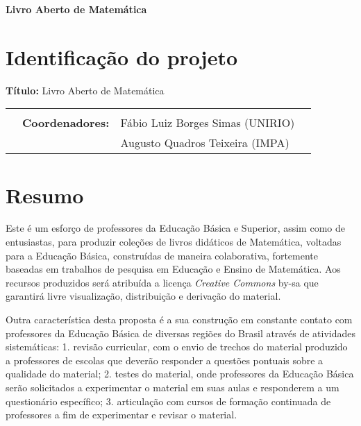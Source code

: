 \documentclass[10 pt]{article}
\begin{document}

\begin{center}
{\Large{\bf   Livro Aberto de Matemática}}
 \end{center}


    \section{Identificação do projeto}
\textbf{T\'itulo:} Livro Aberto de Matemática

\begin{flushright}
  \noindent
  \begin{tabular}{llll}
    &&\\
    &\textbf{Coordenadores:}& Fábio Luiz Borges Simas (UNIRIO)\\
    & & Augusto Quadros Teixeira (IMPA)

  \end{tabular}

\end{flushright}
\vspace{0.3cm}

\section{Resumo}



Este é um esforço de professores da Educação Básica e Superior, assim como de entusiastas, para produzir coleções de livros didáticos de Matemática, voltadas para a Educação Básica, construídas de maneira colaborativa, fortemente baseadas em trabalhos de pesquisa em Educação e Ensino de Matemática.
Aos recursos produzidos será atribuída a licença {\it Creative Commons} by-sa que garantirá livre visualização, distribuição e derivação do material. 

Outra característica desta proposta é a sua construção em constante contato com professores da Educação Básica de diversas regiões do Brasil através de atividades sistemáticas: 
1. revisão curricular, com o envio de trechos do material produzido a professores de escolas que deverão responder a questões pontuais sobre a qualidade do material; 
2. testes do material, onde professores da Educação Básica serão solicitados a experimentar o material em suas aulas e responderem a um questionário específico; 
3. articulação com cursos de formação continuada de professores a fim de experimentar e revisar o material.
\end{document}
